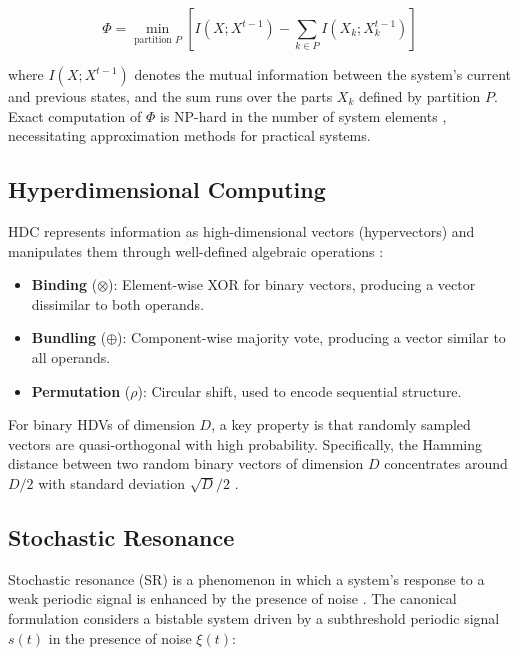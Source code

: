 \documentclass[12pt,a4paper]{article}
\begin{document}
\begin{equation}
\Phi = \min_{\text{partition } P} \left[ I(X; X^{t-1}) - \sum_{k \in P} I(X_k; X_k^{t-1}) \right]
\label{eq:phi}
\end{equation}

where $I(X; X^{t-1})$ denotes the mutual information between the system's current and previous states, and the sum runs over the parts $X_k$ defined by partition $P$. Exact computation of $\Phi$ is NP-hard in the number of system elements \citep{tegmark2016improved}, necessitating approximation methods for practical systems.

\subsection{Hyperdimensional Computing}

HDC represents information as high-dimensional vectors (hypervectors) and manipulates them through well-defined algebraic operations \citep{kanerva2009hyperdimensional}:

\begin{itemize}
    \item \textbf{Binding} ($\otimes$): Element-wise XOR for binary vectors, producing a vector dissimilar to both operands.
    \item \textbf{Bundling} ($\oplus$): Component-wise majority vote, producing a vector similar to all operands.
    \item \textbf{Permutation} ($\rho$): Circular shift, used to encode sequential structure.
\end{itemize}

For binary HDVs of dimension $D$, a key property is that randomly sampled vectors are quasi-orthogonal with high probability. Specifically, the Hamming distance between two random binary vectors of dimension $D$ concentrates around $D/2$ with standard deviation $\sqrt{D}/2$ \citep{kanerva2009hyperdimensional}.

\subsection{Stochastic Resonance}

Stochastic resonance (SR) is a phenomenon in which a system's response to a weak periodic signal is enhanced by the presence of noise \citep{gammaitoni1998stochastic}. The canonical formulation considers a bistable system driven by a subthreshold periodic signal $s(t)$ in the presence of noise $\xi(t)$:
\end{document}
